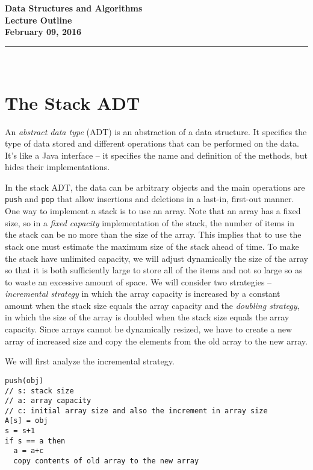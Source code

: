 \documentclass[11pt,twoside]{article}
\newcommand{\coursetitle}{Data Structures and Algorithms}
\newcommand{\docdate}{February 09, 2016}
\newcommand{\duedate}{February 09, 2016}
\newcommand{\doctitle}{Lecture Outline}
\newcommand{\student}{PUT YOUR NAME HERE}
\def\ni{\noindent}
\begin{document}
\thispagestyle{empty}

\begin{center}
\Large\bf\coursetitle\\[2pt]\doctitle\\ \large\docdate
\end{center}
\vspace*{0.10in}

\hrule
~\\

\ni
\section*{The Stack ADT}
An \textit{abstract data type} (ADT) is an abstraction of a data
structure. It specifies the type of data stored and different
operations that can be performed on the data. It's like a Java
interface -- it specifies the name and definition of the methods, but
hides their implementations.

In the stack ADT, the data can be arbitrary objects and the main
operations are \texttt{push} and \texttt{pop} that allow insertions and
deletions in a last-in, first-out manner. One way to implement a stack
is to use an array. Note that an
array has a fixed size, so in a \textit{fixed capacity} implementation
of the stack, the number of items in the stack can be no more than the
size of the array. This implies that to use the stack one must
estimate the maximum size of the stack ahead of time.  To make the
stack have unlimited capacity, we will adjust dynamically the size of
the array so that it is both sufficiently large to store all of the
items and not so large so as to waste an excessive amount of
space. We will consider two strategies -- \textit{incremental
  strategy} in which the array capacity is increased by a constant
amount when the stack size equals the array capacity 
and the \textit{doubling strategy}, in which the
size of the array is doubled when the stack size equals the array
capacity. Since arrays cannot be dynamically
resized, we have to create a new array of increased size and copy the
elements from the old array to the new array. 

We will first analyze the incremental strategy. 

\begin{verbatim}
push(obj)
// s: stack size
// a: array capacity
// c: initial array size and also the increment in array size
A[s] = obj
s = s+1
if s == a then
  a = a+c
  copy contents of old array to the new array
\end{verbatim}
\end{document}
